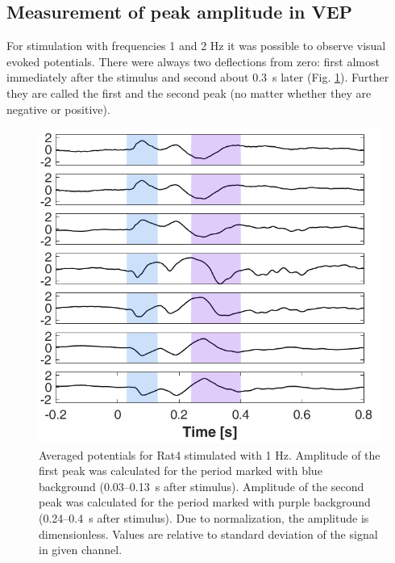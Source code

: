 \documentclass{pracalicmgr}
\begin{document}
   \subsection{Measurement of peak amplitude in VEP}
   For stimulation with frequencies 1 and 2 Hz it was possible to observe visual evoked potentials. There were always two deflections from zero: first almost immediately after the stimulus and second about 0.3~s later (Fig. \ref{rys:wybor_pikow}). Further they are called the first and the second peak (no matter whether they are negative or positive).
   \begin{figure}[H]
   	\begin{center}
   		\includegraphics[scale=0.55]{wybor_pikow.png}
   	\end{center}
   	\caption{Averaged potentials for Rat4 stimulated with 1 Hz. Amplitude of the first peak was calculated for the period marked with blue background (0.03--0.13~s after stimulus). Amplitude of the second peak was calculated for the period marked with purple background (0.24--0.4~s after stimulus). Due to normalization, the amplitude is dimensionless. Values are relative to standard deviation of the signal in given channel.}
   	\label{rys:wybor_pikow}
   \end{figure} 
   
\end{document}
